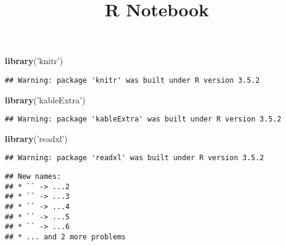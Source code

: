 \documentclass[
]{article}
\title{R Notebook}
\author{}
\date{\vspace{-2.5em}}
\newenvironment{Shaded}{\begin{snugshade}}{\end{snugshade}}
\newcommand{\DataTypeTok}[1]{\textcolor[rgb]{0.13,0.29,0.53}{#1}}
\newcommand{\KeywordTok}[1]{\textcolor[rgb]{0.13,0.29,0.53}{\textbf{#1}}}
\newcommand{\NormalTok}[1]{#1}
\newcommand{\OperatorTok}[1]{\textcolor[rgb]{0.81,0.36,0.00}{\textbf{#1}}}
\newcommand{\OtherTok}[1]{\textcolor[rgb]{0.56,0.35,0.01}{#1}}
\newcommand{\StringTok}[1]{\textcolor[rgb]{0.31,0.60,0.02}{#1}}
\begin{document}
\maketitle

\begin{Shaded}
\begin{Highlighting}[]
\KeywordTok{library}\NormalTok{(}\StringTok{'knitr'}\NormalTok{)}
\end{Highlighting}
\end{Shaded}

\begin{verbatim}
## Warning: package 'knitr' was built under R version 3.5.2
\end{verbatim}

\begin{Shaded}
\begin{Highlighting}[]
\KeywordTok{library}\NormalTok{(}\StringTok{'kableExtra'}\NormalTok{)}
\end{Highlighting}
\end{Shaded}

\begin{verbatim}
## Warning: package 'kableExtra' was built under R version 3.5.2
\end{verbatim}

\begin{Shaded}
\begin{Highlighting}[]
\KeywordTok{library}\NormalTok{(}\StringTok{'readxl'}\NormalTok{)}
\end{Highlighting}
\end{Shaded}

\begin{verbatim}
## Warning: package 'readxl' was built under R version 3.5.2
\end{verbatim}

\begin{Shaded}
\end{Shaded}

\begin{verbatim}
## New names:
## * `` -> ...2
## * `` -> ...3
## * `` -> ...4
## * `` -> ...5
## * `` -> ...6
## * ... and 2 more problems
\end{verbatim}
\end{document}
